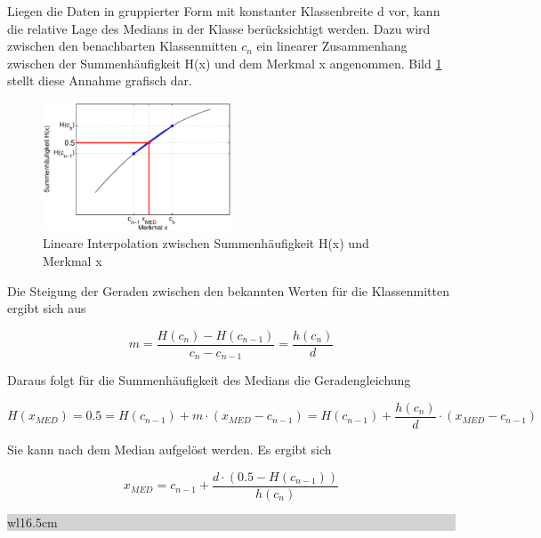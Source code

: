 \noindent Liegen die Daten in gruppierter Form mit konstanter Klassenbreite d vor, kann die relative Lage des Medians in der Klasse ber\"{u}cksichtigt werden. Dazu wird zwischen den benachbarten Klassenmitten $c_{n}$ ein linearer Zusammenhang zwischen der Summenh\"{a}ufigkeit H(x) und dem Merkmal x angenommen. Bild \ref{fig:MedianKlassen}
stellt diese Annahme grafisch dar.

\noindent 
\begin{figure}[H]
  \centerline{\includegraphics[width=0.5\textwidth]{Kapitel3/Bilder/image8}}
  \caption{Lineare Interpolation zwischen Summenh\"{a}ufigkeit H(x) und Merkmal x}
  \label{fig:MedianKlassen}
\end{figure}

\noindent Die Steigung der Geraden zwischen den bekannten Werten f\"{u}r die Klassenmitten ergibt sich aus 

\begin{equation}\label{eq:threetwentyfour}
m=\dfrac{H(c_{n})-H(c_{n-1})}{c_{n} -c_{n-1} } =\dfrac{h(c_{n})}{d}
\end{equation}

\noindent Daraus folgt f\"{u}r die Summenh\"{a}ufigkeit des Medians die Geradengleichung

\begin{equation}\label{eq:threetwentyfive}
H(x_{MED})=0.5=H(c_{n-1})+m\cdot (x_{MED} -c_{n-1} )=H(c_{n-1})+\dfrac{h(c_{n} )}{d} \cdot (x_{MED} -c_{n-1})
\end{equation}

\noindent Sie kann nach dem Median aufgel\"{o}st werden. Es ergibt sich 

\begin{equation}\label{eq:threetwentysix}
x_{MED} =c_{n-1} +\dfrac{d\cdot(0.5-H(c_{n-1}))}{h(c_{n})}
\end{equation}

\noindent
\colorbox{lightgray}{%
%
\renewcommand\arraystretch{0.6}%
\begin{tabular}{ wl{16.5cm} }
{\selectfont
{}}
\end{tabular}%
}\bigskip

